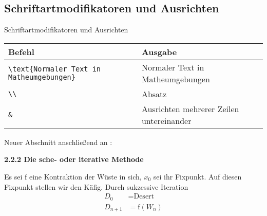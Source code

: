 \subsection{Schriftartmodifikatoren und Ausrichten}
\begin{frame}[c]
	\begin{center}
		\large Schriftartmodifikatoren und Ausrichten
	\end{center}
\end{frame}
\begin{frame}[fragile]
	\begin{center}
		\begin{tabular}{ll}
			\toprule
			Befehl													&	Ausgabe										\\ \midrule
			\lstinline|\text{Normaler Text in Matheumgebungen}|		&	Normaler Text in Matheumgebungen			\\
			\lstinline|\\|											&	Absatz										\\
			\lstinline|&|											&	Ausrichten mehrerer Zeilen untereinander	\\
			\bottomrule
		\end{tabular}
	\end{center}
	\pause\btVFill
	\Aufgabee
	Neuer Abschnitt anschließend an :
	\begin{outputbox}
		{\large\textbf{2.2.2 Die sche- oder iterative Methode}}
		
		Es sei $\mathrm{f}$ eine Kontraktion der Wüste in sich, $x_0$ sei ihr Fixpunkt. Auf diesen Fixpunkt stellen wir den Käfig. Durch sukzessive Iteration
		\begin{align}
		    D_0 	&= \text{Desert} \\
	        D_{n+1} &= \mathrm{f}(W_n)
		\end{align}
	\end{outputbox}
	\vspace{0.3cm}
\end{frame}
